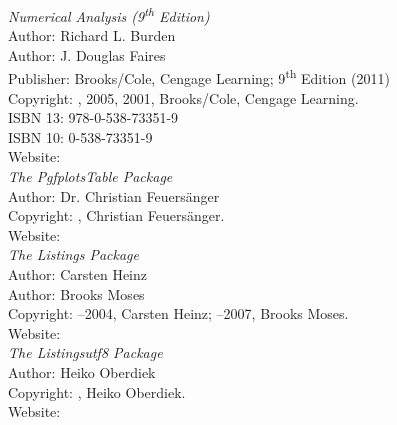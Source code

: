 
\begin{thebibliography}{9}



\emph{Numerical Analysis (9\textsuperscript{th} Edition)}\\
Author: Richard L. Burden\\
Author: J. Douglas Faires\\
Publisher: Brooks/Cole, Cengage Learning; 9\textsuperscript{th} Edition (2011)\\
Copyright: \textcopyright {}, 2005, 2001, Brooks/Cole, Cengage Learning.\\
ISBN 13: 978-0-538-73351-9\\
ISBN 10: 0-538-73351-9\\
Website: \\


\emph{The PgfplotsTable Package}\\
Author: Dr. Christian Feuersänger\\
Copyright: \textcopyright{}, Christian Feuersänger.\\
Website: \\


\emph{The Listings Package}\\
Author: Carsten Heinz\\
Author: Brooks Moses\\
Copyright: \textcopyright{}–2004, Carsten Heinz; \textcopyright{}–2007, Brooks Moses.\\
Website: \\


\emph{The Listingsutf8 Package}\\
Author: Heiko Oberdiek\\
Copyright: \textcopyright{}, Heiko Oberdiek.\\
Website: \\





\end{thebibliography}